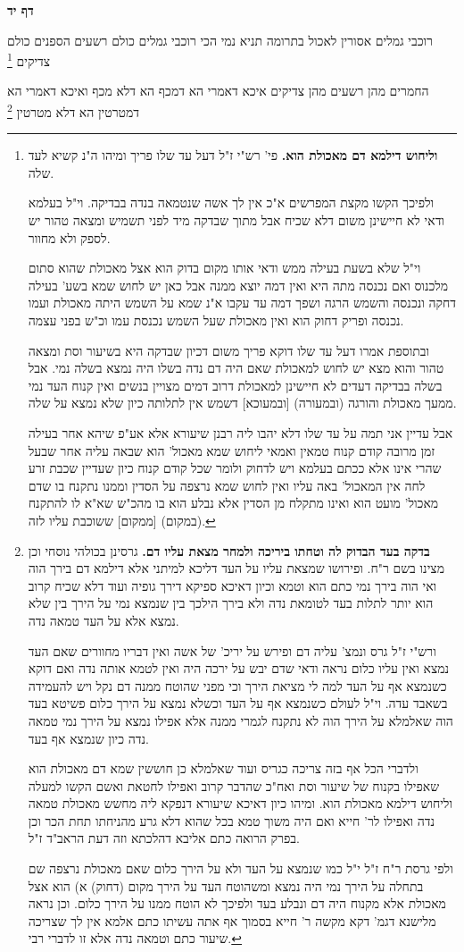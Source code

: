 \documentclass[12pt, openany]{book}
\newcommand{\sethebfont}{
\fontsize{10.5pt}{21.0pt} \selectfont
}
\newcommand{\twocol}[1]{
	{\sethebfont \begin{multicols}{2}
			#1
	\end{multicols}}	
}
\newcommand{\sectname}{}
\newcommand{\newsection}[1]{
	\addcontentsline{toc}{section}{#1}
	\renewcommand{\sectname}{#1}	
	\vspace{-\baselineskip}
	\begin{center}
		\textbf{%
\fontsize{16pt}{16pt}\selectfont
			#1}
	\end{center}
	\vspace{-\baselineskip}
	\nopagebreak
}
\newcommand{\footnotecomment}[1]{\footnote{#1}}
\newcommand{\commenta}[1]{\footnotecomment{#1}}
\begin{document}
\newsection{דף יד}
\twocol{רוכבי גמלים אסורין לאכול בתרומה  תניא נמי הכי  רוכבי גמלים כולם רשעים הספנים כולם צדיקים
\commenta{\textbf{וליחוש דילמא דם מאכולת הוא.}  פי' רש"י ז"ל דעל עד שלו פריך ומיהו ה"נ קשיא לעד שלה.\par  ולפיכך הקשו מקצת המפרשים א"כ אין לך אשה שנטמאה בנדה בבדיקה. וי"ל בעלמא ודאי לא חיישינן משום דלא שכיח אבל מתוך שבדקה מיד לפני תשמיש ומצאה טהור יש לספק ולא מחוור.\par וי"ל שלא בשעת בעילה ממש ודאי אותו מקום בדוק הוא אצל מאכולת שהוא סתום מלכנוס ואם נכנסה מתה היא ואין דמה יוצא ממנה אבל כאן יש לחוש שמא בשע' בעילה דחקה ונכנסה והשמש הרגה ושפך דמה עד עקבו א"נ שמא על השמש היתה מאכולת ועמו נכנסה ופריק דחוק הוא ואין מאכולת שעל השמש נכנסת עמו וכ"ש בפני עצמה.\par  ובתוספת אמרו דעל עד שלו דוקא פריך משום דכיון שבדקה היא בשיעור וסת ומצאה טהור והוא מצא יש לחוש למאכולת שאם היה דם נדה בשלו היה נמצא בשלה נמי. אבל בשלה בבדיקה דעדים לא חיישינן למאכולת דרוב דמים מצויין בנשים ואין קנוח העד נמי ממעך מאכולת והורגה (ובמעורה) [ובמעוכא] דשמש אין לתלותה כיון שלא נמצא על שלה.\par אבל עדיין אני תמה על עד שלו דלא יהבו ליה רבנן שיעורא אלא אע"פ שיהא אחר בעילה זמן מרובה קודם קנוח טמאין ואמאי ליחוש שמא מאכול' הוא שבאה עליה אחר שבעל שהרי אינו אלא ככתם בעלמא ויש לדחוק ולומר שכל קודם קנוח כיון שעדיין שכבת זרע לחה אין המאכול' באה עליו ואין לחוש שמא נרצפה על הסדין וממנו נתקנח בו שדם מאכול' מועט הוא ואינו מתקלח מן הסדין אלא נבלע הוא בו מהכ"ש שא"א לו להתקנח (במקום) [ממקום] ששוכבת עליו לזה. }

החמרים מהן רשעים מהן צדיקים  איכא דאמרי  הא דמכף הא דלא מכף ואיכא דאמרי  הא דמטרטין הא דלא מטרטין 
\commenta{\textbf{בדקה בעד הבדוק לה וטחתו ביריכה ולמחר מצאת עליו דם.}  גרסינן בכולהי נוסחי וכן מצינו בשם ר"ח. ופירושו שמצאת עליו על העד דליכא למיתני אלא דילמא דם בירך הוה ואי הוה בירך נמי כתם הוא וטמא וכיון דאיכא ספיקא דירך גופיה ועוד דלא שכיח קרוב הוא יותר לתלות בעד לטומאת נדה ולא בירך הילכך בין שנמצא נמי על הירך בין שלא נמצא אלא על העד טמאה נדה.\par  ורש"י ז"ל גרס ונמצ' עליה דם ופירש על יריכ' של אשה ואין דבריו מחוורים שאם העד נמצא ואין עליו כלום נראה ודאי שדם יבש על ירכה היה ואין לטמא אותה נדה ואם דוקא כשנמצא אף על העד למה לי מציאת הירך וכי מפני שהוטח ממנה דם נקל ויש להעמידה בשאבד עדה. וי"ל לעולם כשנמצא אף על העד וכשלא נמצא על הירך כלום פשיטא בעד הוה שאלמלא על הירך הוה לא נתקנח לגמרי ממנה אלא אפילו נמצא על הירך נמי טמאה נדה כיון שנמצא אף בעד.\par  ולדברי הכל אף בזה צריכה כגריס ועוד שאלמלא כן חוששין שמא דם מאכולת הוא שאפילו בקנוח של שיעור וסת ואח"כ שהדבר קרוב ואפילו לחטאת ואשם הקשו למעלה וליחוש דילמא מאכולת הוא. ומיהו כיון דאיכא שיעורא דנפקא ליה מחשש מאכולת טמאה נדה ואפילו לר' חייא ואם היה משוך טמא בכל שהוא דלא גרע מהניחתו תחת הכר וכן בפרק הרואה כתם אליבא דהלכתא וזה דעת הראב"ד ז"ל.\par ולפי גרסת ר"ח ז"ל י"ל כמו שנמצא על העד ולא על הירך כלום שאם מאכולת נרצפה שם בתחלה על הירך נמי היה נמצא ומשהוטח העד על הירך מקום (דחוק) א) הוא אצל מאכולת אלא מקנוח היה דם ונבלע בעד ולפיכך לא הוטח ממנו על הירך כלום. וכן נראה מלישנא דגמ' דקא מקשה ר' חייא בסמוך אף אתה עשיתו כתם אלמא אין לך שצריכה שיעור כתם וטמאה נדה אלא זו לדברי רבי. }

}
\end{document}
